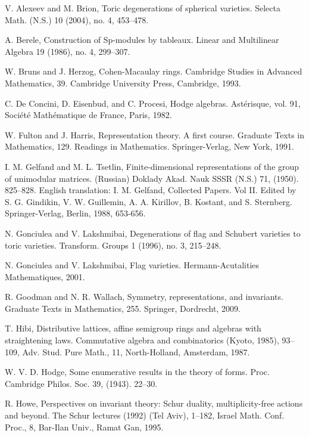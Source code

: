 \documentclass[11pt]{amsart}
\numberwithin{equation}{subsection}
\begin{document}
\begin{thebibliography}{DEP82}
 V. Alexeev and M. Brion, Toric degenerations of
spherical varieties. Selecta Math. (N.S.) 10 (2004), no. 4, 453--478.

 A. Berele, Construction of \textrm{Sp}-modules by
tableaux. Linear and Multilinear Algebra 19 (1986), no. 4, 299--307.


 W. Bruns and J. Herzog, Cohen-Macaulay rings. Cambridge
Studies in Advanced Mathematics, 39. Cambridge University Press, Cambridge,
1993.


 C. De Concini, D. Eisenbud, and C. Procesi, Hodge
algebras. Ast\'{e}risque, vol. 91, Soci\'{e}t\'{e} Math\'{e}matique de
France, Paris, 1982.

 W. Fulton and J. Harris, Representation theory. A first
course. Graduate Texts in Mathematics, 129. Readings in Mathematics.
Springer-Verlag, New York, 1991.

 I. M. Gelfand and M. L. Tsetlin, Finite-dimensional
representations of the group of unimodular matrices. (Russian) Doklady Akad.
Nauk SSSR (N.S.) 71, (1950). 825--828. English translation: I. M. Gelfand,
Collected Papers. Vol II. Edited by S. G. Gindikin, V. W. Guillemin, A. A.
Kirillov, B. Kostant, and S. Sternberg. Springer-Verlag, Berlin, 1988,
653-656.

 N. Gonciulea and V. Lakshmibai, Degenerations of flag
and Schubert varieties to toric varieties. Transform. Groups 1 (1996), no.
3, 215--248.

 N. Gonciulea and V. Lakshmibai, Flag varieties.
Hermann-Acutalities Mathematiques, 2001.

 R. Goodman and N. R. Wallach, Symmetry, representations, 
and invariants. Graduate Texts in Mathematics, 255. Springer, Dordrecht, 2009.

 T. Hibi, Distributive lattices, affine semigroup rings
and algebras with straightening laws. Commutative algebra and combinatorics
(Kyoto, 1985), 93--109, Adv. Stud. Pure Math., 11, North-Holland, Amsterdam,
1987.

 W. V. D. Hodge, Some enumerative results in the
theory of forms. Proc. Cambridge Philos. Soc. 39, (1943). 22--30.

 R. Howe, Perspectives on invariant theory: Schur
duality, multiplicity-free actions and beyond. The Schur lectures (1992)
(Tel Aviv), 1--182, Israel Math. Conf. Proc., 8, Bar-Ilan Univ., Ramat Gan,
1995.


\end{thebibliography}
\end{document}
